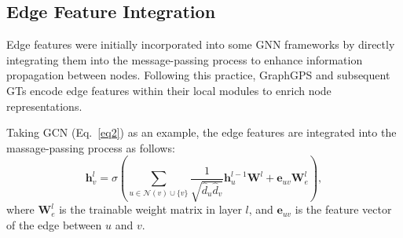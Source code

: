 
\subsection{Edge Feature Integration}


Edge features were initially incorporated into some GNN frameworks \cite{gilmer2017neural, hu2019strategies} by directly integrating them into the message-passing process to enhance information propagation between nodes. Following this practice, GraphGPS \cite{rampavsek2022recipe} and subsequent GTs encode edge features within their local modules to enrich node representations. 

Taking GCN (Eq.~\ref{eq2}) as an example, the edge features are integrated into the massage-passing process as follows:
\begin{equation}
\boldsymbol{h}_v^l = \sigma(\sum_{u \in \mathcal{N}(v) \cup \{v\}} \frac{1}{\sqrt{\hat{d}_u \hat{d}_v}} \boldsymbol{h}_{u}^{l-1}\boldsymbol{W}^l+\boldsymbol{e}_{uv}\boldsymbol{W}^l_e),
\end{equation} 
where $\boldsymbol{W}^l_e$ is the trainable weight matrix in layer $l$, and $\boldsymbol{e}_{uv}$ is the feature vector of the edge between $u$ and $v$.

